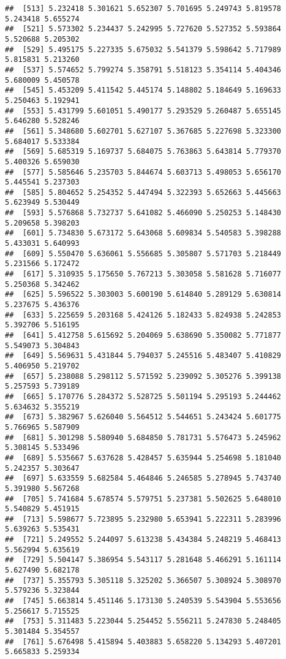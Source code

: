 \documentclass[
]{article}
\begin{document}
\begin{verbatim}
##  [513] 5.232418 5.301621 5.652307 5.701695 5.249743 5.819578 5.243418 5.655274
##  [521] 5.573302 5.234437 5.242995 5.727620 5.527352 5.593864 5.520688 5.205302
##  [529] 5.495175 5.227335 5.675032 5.541379 5.598642 5.717989 5.815831 5.213260
##  [537] 5.574652 5.799274 5.358791 5.518123 5.354114 5.404346 5.680009 5.450578
##  [545] 5.453209 5.411542 5.445174 5.148802 5.184649 5.169633 5.250463 5.192941
##  [553] 5.431799 5.601051 5.490177 5.293529 5.260487 5.655145 5.646280 5.528246
##  [561] 5.348680 5.602701 5.627107 5.367685 5.227698 5.323300 5.684017 5.533384
##  [569] 5.685319 5.169737 5.684075 5.763863 5.643814 5.779370 5.400326 5.659030
##  [577] 5.585646 5.235703 5.844674 5.603713 5.498053 5.656170 5.445541 5.237303
##  [585] 5.804652 5.254352 5.447494 5.322393 5.652663 5.445663 5.623949 5.530449
##  [593] 5.576868 5.732737 5.641082 5.466090 5.250253 5.148430 5.209658 5.398203
##  [601] 5.734830 5.673172 5.643068 5.609834 5.540583 5.398288 5.433031 5.640993
##  [609] 5.550470 5.636061 5.556685 5.305807 5.571703 5.218449 5.231566 5.172472
##  [617] 5.310935 5.175650 5.767213 5.303058 5.581628 5.716077 5.250368 5.342462
##  [625] 5.596522 5.303003 5.600190 5.614840 5.289129 5.630814 5.237675 5.436376
##  [633] 5.225659 5.203168 5.424126 5.182433 5.824938 5.242853 5.392706 5.516195
##  [641] 5.412758 5.615692 5.204069 5.638690 5.350082 5.771877 5.549073 5.304843
##  [649] 5.569631 5.431844 5.794037 5.245516 5.483407 5.410829 5.406950 5.219702
##  [657] 5.238088 5.298112 5.571592 5.239092 5.305276 5.399138 5.257593 5.739189
##  [665] 5.170776 5.284372 5.528725 5.501194 5.295193 5.244462 5.634632 5.355219
##  [673] 5.382967 5.626040 5.564512 5.544651 5.243424 5.601775 5.766965 5.587909
##  [681] 5.301298 5.580940 5.684850 5.781731 5.576473 5.245962 5.308145 5.533496
##  [689] 5.535667 5.637628 5.428457 5.635944 5.254698 5.181040 5.242357 5.303647
##  [697] 5.633559 5.682584 5.464846 5.246585 5.278945 5.743740 5.391980 5.567268
##  [705] 5.741684 5.678574 5.579751 5.237381 5.502625 5.648010 5.540829 5.451915
##  [713] 5.598677 5.723895 5.232980 5.653941 5.222311 5.283996 5.639263 5.535431
##  [721] 5.249552 5.244097 5.613238 5.434384 5.248219 5.468413 5.562994 5.635619
##  [729] 5.504147 5.386954 5.543117 5.281648 5.466291 5.161114 5.627490 5.682178
##  [737] 5.355793 5.305118 5.325202 5.366507 5.308924 5.308970 5.579236 5.323844
##  [745] 5.663814 5.451146 5.173130 5.240539 5.543904 5.553656 5.256617 5.715525
##  [753] 5.311483 5.223044 5.254452 5.556211 5.247830 5.248405 5.301484 5.354557
##  [761] 5.676498 5.415894 5.403883 5.658220 5.134293 5.407201 5.665833 5.259334

\end{verbatim}
\end{document}

